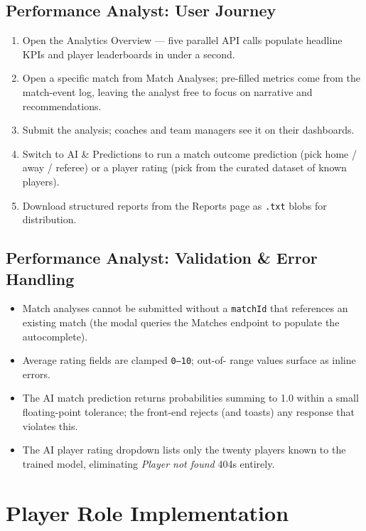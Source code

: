 \documentclass[12pt,a4paper,oneside]{report}
\begin{document}
\subsection*{Performance Analyst: User Journey}
\begin{enumerate}[leftmargin=*]
  \item Open the Analytics Overview --- five parallel API calls
        populate headline KPIs and player leaderboards in under a
        second.
  \item Open a specific match from Match Analyses; pre-filled
        metrics come from the match-event log, leaving the analyst
        free to focus on narrative and recommendations.
  \item Submit the analysis; coaches and team managers see it on
        their dashboards.
  \item Switch to AI \& Predictions to run a match outcome
        prediction (pick home / away / referee) or a player rating
        (pick from the curated dataset of known players).
  \item Download structured reports from the Reports page as
        \texttt{.txt} blobs for distribution.
\end{enumerate}

\subsection*{Performance Analyst: Validation \& Error Handling}
\begin{itemize}[leftmargin=*]
  \item Match analyses cannot be submitted without a
        \texttt{matchId} that references an existing match (the
        modal queries the Matches endpoint to populate the
        autocomplete).
  \item Average rating fields are clamped \texttt{0--10}; out-of-
        range values surface as inline errors.
  \item The AI match prediction returns probabilities summing to
        1.0 within a small floating-point tolerance; the front-end
        rejects (and toasts) any response that violates this.
  \item The AI player rating dropdown lists only the twenty players
        known to the trained model, eliminating
        \emph{Player not found} 404s entirely.
\end{itemize}

\section{Player Role Implementation}
\label{sec:impl-player}
\end{document}

